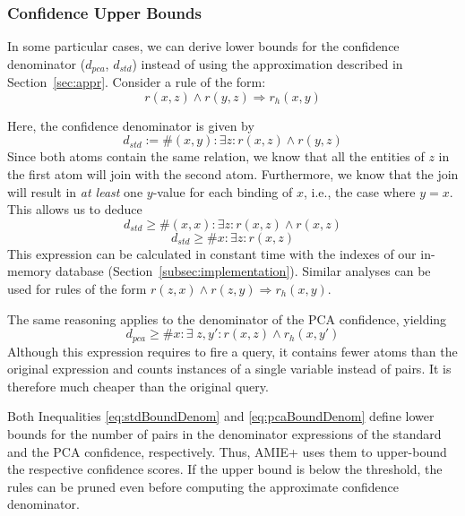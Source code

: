 \subsubsection{Confidence Upper Bounds}\label{sec:conf_upperBounds}
In some particular cases, we can derive lower bounds for the confidence denominator ($d_{pca}$, $d_{std}$) instead of using the approximation described in Section~\ref{sec:appr}.
Consider a rule of the form:
$$ r(x,z) \wedge r(y,z) \Rightarrow r_h(x,y) $$

\noindent Here, the confidence denominator is given by
$$
d_{std} := \#(x,y): \exists z: r(x,z) \wedge r(y,z)
$$
Since both atoms contain the same relation, we know that all the entities of $z$ in the first atom
will join with the second atom. Furthermore,
we know that the join will result in \emph{at least} one $y$-value for each binding of $x$, i.e., the case where $y=x$. This allows us to deduce
\[
d_{std} \ge \#(x,x): \exists z:  r(x,z) \wedge r(x,z)
\]
\begin{equation}
d_{std} \ge \#x: \exists z:  r(x,z)  \label{eq:stdBoundDenom}
\end{equation}
This expression can be calculated in constant time with the indexes of our in-memory database (Section~\ref{subsec:implementation}).
Similar analyses can be used for rules of the form $r(z,x) \wedge r(z,y) \Rightarrow r_h(x,y) $.

The same reasoning applies to the denominator of the PCA confidence, yielding
\begin{equation} \label{eq:pcaBoundDenom}
d_{pca} \ge \#x: \exists \;z, y': r(x,z) \wedge r_h(x,y')
\end{equation}
Although this expression requires to fire a query, it contains fewer atoms than the original expression and counts instances
of a single variable instead of pairs. It is therefore much cheaper than the original query.

Both Inequalities \ref{eq:stdBoundDenom} and \ref{eq:pcaBoundDenom}
define lower bounds for the number of pairs in the denominator expressions of the standard
and the PCA confidence, respectively.
Thus, AMIE+ uses them to upper-bound the respective confidence scores. If the upper bound is below the threshold,
the rules can be pruned even before computing the approximate confidence denominator.







